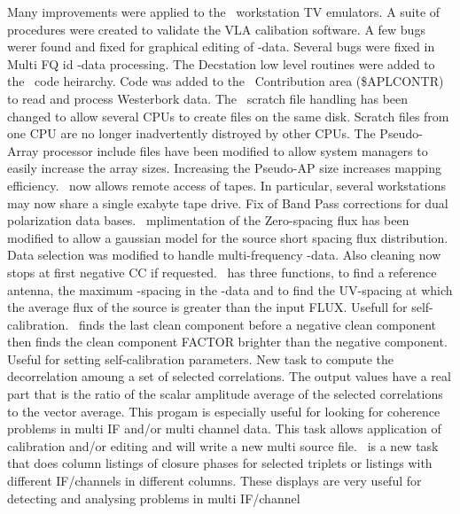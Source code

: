 \begin{description}
 Many improvements were applied to the \AIPS\ workstation
TV emulators.
 A suite of procedures were created to
validate the VLA calibation software.
\myitem{\TVFLG} A few bugs werer found and fixed for graphical
editing of \UV-data.
 Several bugs were fixed in Multi FQ id \UV-data
processing.
 The Decstation low level routines were added
to the \AIPS\ code heirarchy.
 Code was added to the \AIPS\ Contribution area
(\$APLCONTR) to read and process Westerbork data.
 The \AIPS\ scratch file handling has been changed
to allow several CPUs to create files on the same disk.  Scratch
files from one CPU are no longer inadvertently distroyed by
other CPUs.
 The Pseudo-Array processor include files
have been modified to allow system managers to easily increase
the array sizes.
Increasing the Pseudo-AP size increases mapping efficiency.
 \AIPS\ now allows remote access of tapes.  In
particular, several workstations may now share a single exabyte tape
drive.
\myitem{\BPASS} Fix of Band Pass corrections for dual polarization
data bases.
\myitem{\MX} \MX\ mplimentation of the Zero-spacing flux has been
modified to allow a gaussian model for the source short spacing flux
distribution.
Data selection was modified to handle multi-frequency
\UV-data.
Also cleaning now stops at first negative CC if requested.
\myitem{\UVPRM}
\UVPRM\ has three functions, to find a reference
antenna, the maximum \UV-spacing in the \UV-data and to find
the UV-spacing at which the average flux of the source is
greater than the input FLUX.
Usefull for self-calibration.
\myitem{\CCFND}  \CCFND\ finds the last
clean component before a negative clean component then finds
the clean component FACTOR brighter than the negative component.
Useful for setting self-calibration parameters.
\myitem{\DECOR} New task to compute the decorrelation amoung a set of
selected correlations.  The output values have a real part that is the
ratio of the scalar amplitude average of the selected
correlations to the vector average.  This progam is especially
useful for looking for coherence problems in multi IF and/or
multi channel data.  This task allows application of calibration
and/or editing and will write a new multi source file.
\myitem{\SHOUV} \SHOUV\ is a new task that does column listings of closure
phases for selected triplets or listings with different
IF/channels in different columns.  These displays are very
useful for detecting and analysing problems in multi IF/channel

\end{description}
